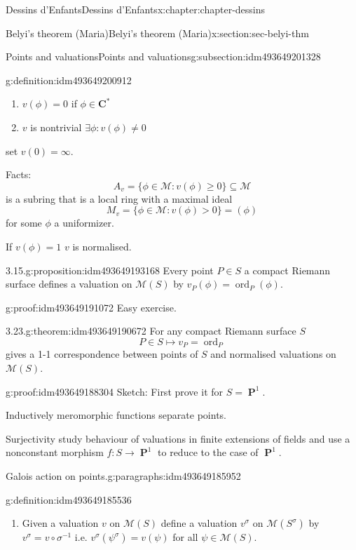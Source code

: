 \documentclass[oneside,10pt,]{book}
\numberwithin{equation}{section}
\newcommand{\CC}{\mathbf{C}}
\DeclareMathOperator{\ord}{ord}
\DeclareMathOperator{\PP}{\mathbf{P}}
\newcommand{\gt}{>}
\begin{document}
\begin{chapterptx}{Dessins d'Enfants}{}{Dessins d'Enfants}{}{}{x:chapter:chapter-dessins}
\begin{sectionptx}{Belyi's theorem (Maria)}{}{Belyi's theorem (Maria)}{}{}{x:section:sec-belyi-thm}
\begin{subsectionptx}{Points and valuations}{}{Points and valuations}{}{}{g:subsection:idm493649201328}
\begin{definition}{}{g:definition:idm493649200912}
\begin{enumerate}
\item{}\(v(\phi) = 0 \) if \(\phi \in \CC^*\)%
\item{}\(v\) is nontrivial \(\exists \phi : v(\phi)\ne 0\)%
\end{enumerate}
set \(v(0) = \infty\).%
\end{definition}
Facts:%
\begin{equation*}
A_v = \{\phi \in \mathcal M : v(\phi) \ge 0 \} \subseteq \mathcal M
\end{equation*}
is a subring that is a local ring with a maximal ideal%
\begin{equation*}
M_v = \{ \phi\in \mathcal M : v(\phi) \gt 0\} = (\phi)
\end{equation*}
for some \(\phi\) a uniformizer.%
\par
If \(v(\phi) = 1\) \(v\) is normalised.%
\begin{proposition}{3.15.}{}{g:proposition:idm493649193168}%
Every point \(P \in S\) a compact Riemann surface defines a valuation on \(\mathcal M(S)\) by \(v_P(\phi) = \ord_P(\phi)\).%
\end{proposition}
\begin{proofptx}{}{g:proof:idm493649191072}
Easy exercise.%
\end{proofptx}
\begin{theorem}{3.23.}{}{g:theorem:idm493649190672}%
For any compact Riemann surface \(S\)%
\begin{equation*}
P\in S \mapsto v_P = \ord_P
\end{equation*}
gives a 1-1 correspondence between points of \(S\) and normalised valuations on \(\mathcal M(S)\).%
\end{theorem}
\begin{proofptx}{}{g:proof:idm493649188304}
Sketch: First prove it for \(S = \PP^1\).%
\par
Inductively meromorphic functions separate points.%
\par
Surjectivity study behaviour of valuations in finite extensions of fields and use a nonconstant morphism \(f\colon S \to \PP^1\) to reduce to the case of \(\PP^1\).%
\end{proofptx}
\begin{paragraphs}{Galois action on points.}{g:paragraphs:idm493649185952}%
\begin{definition}{}{g:definition:idm493649185536}%
%
\begin{enumerate}
\item{}Given a valuation \(v\) on \(\mathcal M(S)\) define a valuation \(v^\sigma\) on \(\mathcal M(S^\sigma)\) by \(v^\sigma = v\circ \sigma^{-1}\) i.e. \(v^\sigma(\psi^\sigma) = v(\psi)\) for all \(\psi \in \mathcal M(S)\).%

\end{enumerate}
\end{definition}
\end{paragraphs}
\end{subsectionptx}
\end{sectionptx}
\end{chapterptx}
\end{document}
